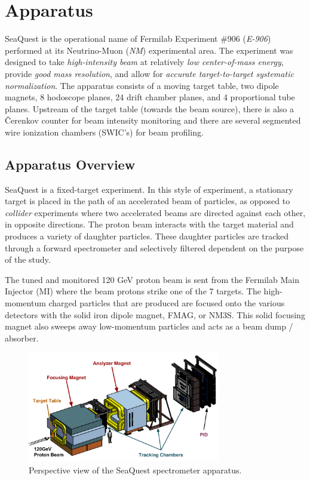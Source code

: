 \chapter{Apparatus}

SeaQuest is the operational name of Fermilab Experiment \#906 (\emph{E-906}) performed at its Neutrino-Muon (\emph{NM})
experimental area. The experiment was designed
to take \emph{high-intensity beam} at relatively \emph{low center-of-mass energy}, provide
\emph{good mass resolution}, and allow for \emph{accurate target-to-target systematic normalization}.
The apparatus consists of a moving target table, two dipole magnets, 8 hodoscope planes, 24 drift 
chamber planes, and 4 proportional tube planes. Upstream of the target table (towards the beam source),
there is also a \v{C}erenkov counter for beam intensity monitoring and there are
several segmented wire ionization chambers (SWIC's) for beam profiling.

\section{Apparatus Overview}

SeaQuest is a fixed-target experiment. In this style of
experiment, a stationary target is placed in the path of an accelerated beam of particles, as opposed to \emph{collider} 
experiments where two accelerated beams are directed against each other, in opposite directions. The proton beam
interacts with the target material and produces a variety of daughter particles. These daughter particles are 
tracked through a forward spectrometer and selectively filtered dependent on the purpose of the study.

The tuned and monitored 120 GeV proton beam is sent from the Fermilab Main Injector (MI) where the beam
protons strike one of the 7 targets. The high-momentum charged particles that are produced are focused
onto the various detectors with the solid iron dipole magnet, FMAG, or NM3S. 
This solid focusing magnet also sweeps away low-momentum particles and acts as a beam dump / absorber.

\begin{figure}
	\begin{center}
		\includegraphics[width=0.75\textwidth]{figures/Spectrometer.png}
		\caption{Perspective view of the SeaQuest spectrometer apparatus.}
		\label{fig:spectrometer-perspective}
	\end{center}
\end{figure}


